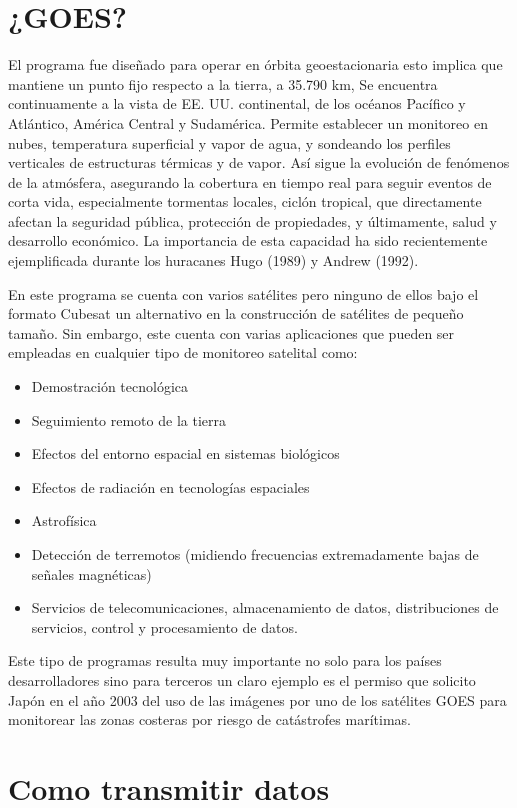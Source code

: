 \documentclass[12pt]{extarticle}
\begin{document}
 \section{¿GOES?}
  El programa fue diseñado para operar en órbita geoestacionaria esto implica que mantiene un punto fijo respecto a la tierra, a 35.790 km, Se encuentra continuamente a la vista de EE. UU. continental, de los océanos Pacífico y Atlántico, América Central y Sudamérica.
Permite establecer un monitoreo en nubes, temperatura superficial y vapor de agua, y sondeando los perfiles verticales de estructuras térmicas y de vapor. Así sigue la evolución de fenómenos de la atmósfera, asegurando la cobertura en tiempo real para seguir eventos de corta vida, especialmente tormentas locales, ciclón tropical, que directamente afectan la seguridad pública, protección de propiedades, y últimamente, salud y desarrollo económico. La importancia de esta capacidad ha sido recientemente ejemplificada durante los huracanes Hugo (1989) y Andrew (1992).


En este programa se cuenta con varios satélites  pero ninguno de ellos bajo el formato Cubesat un alternativo en la construcción de satélites de pequeño tamaño. Sin embargo, este cuenta con varias aplicaciones que pueden ser empleadas en cualquier tipo de monitoreo satelital como:
\begin{itemize}
    \item Demostración tecnológica 
    \item Seguimiento remoto de la tierra
    \item Efectos del entorno espacial en sistemas biológicos
    \item Efectos de radiación en tecnologías espaciales
    \item Astrofísica 
    \item Detección de terremotos (midiendo frecuencias extremadamente bajas de señales magnéticas)
    \item Servicios de telecomunicaciones, almacenamiento de datos, distribuciones de servicios, control y procesamiento de datos.
\end{itemize}

Este tipo de programas resulta muy importante no solo para los países desarrolladores sino para terceros  un claro ejemplo es el permiso que solicito Japón en el año 2003 del uso de las imágenes por uno de los satélites GOES para monitorear las zonas costeras por riesgo de catástrofes marítimas.

\section{Como transmitir datos}
\end{document}
